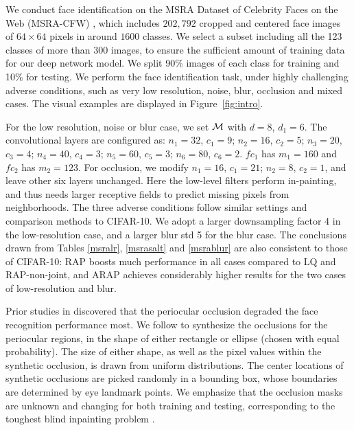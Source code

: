 \documentclass[10pt,twocolumn,twoside]{IEEEtran} %
\begin{document}
We conduct face identification on the MSRA Dataset of Celebrity Faces on the Web (MSRA-CFW) \cite{zhang2012finding}, 
which includes $202, 792$ cropped and centered face images of $64\times64$ pixels in around $1600$ classes. We select a subset including all the 123 classes of more than $300$ images, to ensure the sufficient amount of training data for our deep network model. We split 90\% images of each class for training and 10\% for testing. We perform the face identification task, under highly challenging adverse conditions, such as very low resolution, noise, blur, occlusion and mixed cases. The visual examples are displayed in Figure~\ref{fig:intro}.

For the low resolution, noise or blur case, we set ${\mathcal{M}}$ with $d = 8$,  $d_1 = 6$. The convolutional layers are configured as: $n_1 = 32$, $c_1 = 9$;  $n_2 = 16$, $c_2 = 5$;  $n_3 = 20$, $c_3 = 4$; $n_4 = 40$, $c_4 = 3$; $n_5 = 60$, $c_5 = 3$; $n_6 = 80$, $c_6 = 2$. $fc_1$ has $m_1 = 160$ and $fc_2$ has $m_2 = 123$. For occlusion, we modify $n_1 = 16$, $c_1 = 21$;  $n_2 = 8$, $c_2 = 1$, and leave other six layers unchanged. Here the low-level filters perform in-painting, and thus needs larger receptive fields to predict missing pixels from neighborhoods. 
The three adverse conditions follow similar settings and comparison methods to CIFAR-10. We adopt a larger downsampling factor 4 in the low-resolution case, and a larger blur std 5 for the blur case. The conclusions drawn from Tables \ref{msralr}, \ref{msrasalt} and \ref{msrablur} are also consistent to those of CIFAR-10: RAP boosts much performance in all cases compared to LQ and RAP-non-joint, and ARAP achieves considerably higher results for the two cases of low-resolution and blur.

Prior studies in \cite{karahan2016image} discovered that the periocular occlusion degraded the face recognition performance most. We follow \cite{karahan2016image} to synthesize the occlusions for the periocular regions, in the shape of either rectangle or ellipse (chosen with equal probability). The size of either shape, as well as the pixel values within the synthetic occlusion, is drawn from uniform distributions. The center locations of synthetic occlusions are picked randomly in a bounding box, whose boundaries are determined by eye landmark points. We emphasize that the occlusion masks are unknown and changing for both training and testing, corresponding to the toughest blind inpainting problem \cite{xie2012image}. 
\end{document}
